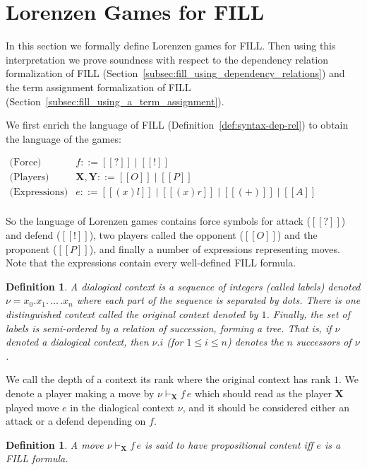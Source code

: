 \documentclass{article}
\newtheorem{definition}[theorem]{Definition}
\begin{document}
\section{Lorenzen Games for FILL}
\label{sec:lorenzen_games_for_fill}

In this section we formally define Lorenzen games for FILL.  Then
using this interpretation we prove soundness with respect to the
dependency relation formalization of FILL
(Section~\ref{subsec:fill_using_dependency_relations}) and the term
assignment formalization of FILL
(Section~\ref{subsec:fill_using_a_term_assignment}).

We first enrich the language of FILL
(Definition~\ref{def:syntax-dep-rel}) to obtain the language of the
games:
\newcommand{\player}[1]{\textbf{#1}}

\begin{center}
  \begin{math}
    \begin{array}{lll}
      \text{(Force)}   & f ::= [[?]] \mid [[!]]\\
      \text{(Players)} & \player{X},\player{Y} ::= [[O]] \mid [[P]]\\
      \text{(Expressions)} & e ::= [[(x)l]] \mid [[(x)r]] \mid [[(+)]] \mid [[A]]\\
    \end{array}
  \end{math}
\end{center}
So the language of Lorenzen games contains force symbols for attack
($[[?]]$) and defend ($[[!]]$), two players called the opponent
($[[O]]$) and the proponent ($[[P]]$), and finally a number of
expressions representing moves.  Note that the expressions contain
every well-defined FILL formula. 

\begin{definition}
  \label{def:dialogical-context}
  A \emph{dialogical context} is a sequence of integers (called
  labels) denoted $\nu = x_0.x_1.\,\ldots\,.x_n$ where each part of
  the sequence is separated by dots.  There is one distinguished
  context called the original context denoted by $1$.  Finally, the
  set of labels is semi-ordered by a relation of succession, forming a
  tree.  That is, if $\nu$ denoted a dialogical context, then $\nu.i$
  (for $1 \leq i \leq n$) denotes the $n$ successors of $\nu$.
\end{definition}
We call the depth of a context its rank where the original context has
rank $1$. We denote a player making a move by $\nu \vdash_\player{X} f\,e$ which should read as the player
$\player{X}$ played move $e$ in the dialogical context $\nu$, and it
should be considered either an attack or a defend depending on $f$.
\begin{definition}
  \label{def:propositional-content}
  A move $\nu \vdash_\player{X} f\,e$ is said to have
  \emph{propositional content} iff $e$ is a FILL formula.
\end{definition}
\end{document}
